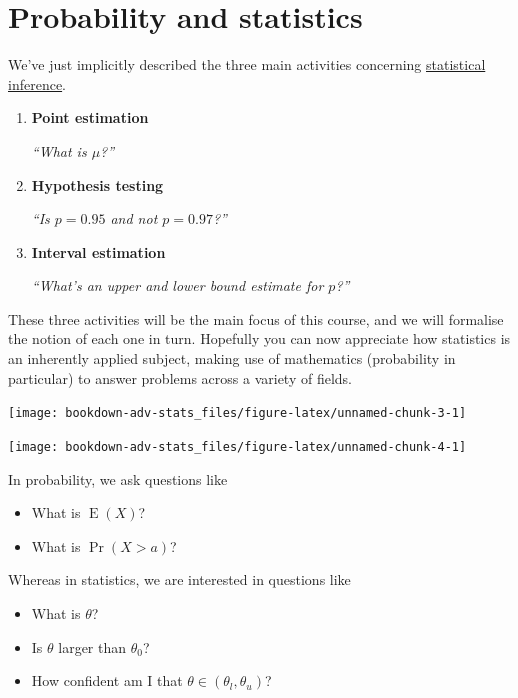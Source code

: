 \documentclass[
]{book}
\providecommand{\tightlist}{%
  \setlength{\itemsep}{0pt}\setlength{\parskip}{0pt}}
\DeclareMathOperator{\E}{E}
\theoremstyle{definition}
\theoremstyle{definition}
\theoremstyle{definition}
\theoremstyle{definition}
\theoremstyle{remark}
\begin{document}
\hypertarget{probability-and-statistics}{%
\section*{Probability and statistics}\label{probability-and-statistics}}

We've just implicitly described the three main activities concerning \uline{statistical inference}.

\begin{enumerate}
\def\labelenumi{\arabic{enumi}.}
\item
  \textbf{Point estimation}

  \emph{``What is \(\mu\)?''}
\item
  \textbf{Hypothesis testing}

  \emph{``Is \(p=0.95\) and not \(p=0.97\)?''}
\item
  \textbf{Interval estimation}

  \emph{``What's an upper and lower bound estimate for \(p\)?''}
\end{enumerate}

These three activities will be the main focus of this course, and we will formalise the notion of each one in turn.
Hopefully you can now appreciate how statistics is an inherently applied subject, making use of mathematics (probability in particular) to answer problems across a variety of fields.

\begin{center}\texttt{[image: bookdown-adv-stats\_files/figure-latex/unnamed-chunk-3-1]} \end{center}

\begin{center}\texttt{[image: bookdown-adv-stats\_files/figure-latex/unnamed-chunk-4-1]} \end{center}

In probability, we ask questions like

\begin{itemize}
\tightlist
\item
  What is \(\E(X)\)?
\item
  What is \(\Pr(X > a)\)?
\end{itemize}

Whereas in statistics, we are interested in questions like

\begin{itemize}
\tightlist
\item
  What is \(\theta\)?
\item
  Is \(\theta\) larger than \(\theta_0\)?
\item
  How confident am I that \(\theta \in (\theta_l,\theta_u)\)?
\end{itemize}
\end{document}
